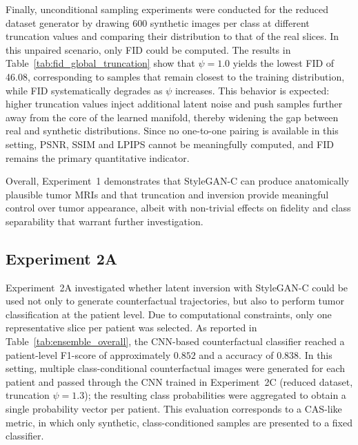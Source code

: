 Finally, unconditional sampling experiments were conducted for the reduced dataset generator by drawing 600 synthetic images per class at different truncation values and comparing their distribution to that of the real slices. In this unpaired scenario, only FID could be computed. The results in Table~\ref{tab:fid_global_truncation} show that $\psi = 1.0$ yields the lowest FID of 46.08, corresponding to samples that remain closest to the training distribution, while FID systematically degrades as $\psi$ increases. This behavior is expected: higher truncation values inject additional latent noise and push samples further away from the core of the learned manifold, thereby widening the gap between real and synthetic distributions. Since no one-to-one pairing is available in this setting, PSNR, SSIM and LPIPS cannot be meaningfully computed, and FID remains the primary quantitative indicator. 

Overall, Experiment~1 demonstrates that StyleGAN-C can produce anatomically plausible tumor MRIs and that truncation and inversion provide meaningful control over tumor appearance, albeit with non-trivial effects on fidelity and class separability that warrant further investigation.\\


\subsection{Experiment 2A}

Experiment~2A investigated whether latent inversion with StyleGAN-C could be used not only to generate counterfactual trajectories, but also to perform tumor classification at the patient level. Due to computational constraints, only one representative slice per patient was selected. As reported in Table~\ref{tab:ensemble_overall}, the CNN-based counterfactual classifier reached a patient-level F1-score of approximately $0.852$ and a accuracy of $0.838$. In this setting, multiple class-conditional counterfactual images were generated for each patient and passed through the CNN trained in Experiment~2C (reduced dataset, truncation $\psi = 1.3$); the resulting class probabilities were aggregated to obtain a single probability vector per patient. This evaluation corresponds to a CAS-like metric, in which only synthetic, class-conditioned samples are presented to a fixed classifier.\\

